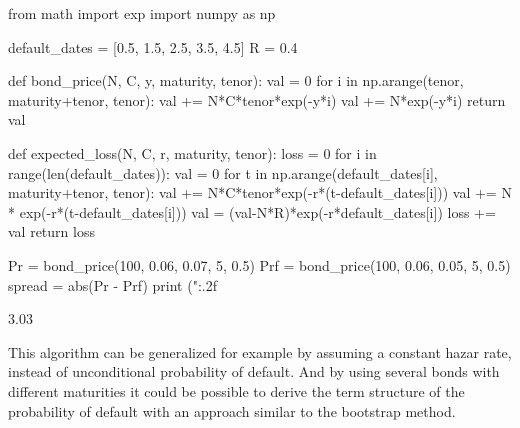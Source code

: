 \begin{ipython}
from math import exp
import numpy as np

default_dates = [0.5, 1.5, 2.5, 3.5, 4.5]
R = 0.4

def bond_price(N, C, y, maturity, tenor):
    val = 0
    for i in np.arange(tenor, maturity+tenor, tenor):
        val += N*C*tenor*exp(-y*i)
    val += N*exp(-y*i)
    return val

def expected_loss(N, C, r, maturity, tenor):
    loss = 0
    for i in range(len(default_dates)):
        val = 0
        for t in np.arange(default_dates[i], maturity+tenor, tenor):
            val += N*C*tenor*exp(-r*(t-default_dates[i]))
        val += N * exp(-r*(t-default_dates[i]))
        val = (val-N*R)*exp(-r*default_dates[i])
        loss += val
    return loss

Pr = bond_price(100, 0.06, 0.07, 5, 0.5)
Prf = bond_price(100, 0.06, 0.05, 5, 0.5)
spread = abs(Pr - Prf)
print ("{:.2f}%
\end{ipython}
\begin{ioutput}
3.03%
\end{ioutput}

This algorithm can be generalized for example by assuming a constant hazar rate, instead of unconditional probability of default. And by using several bonds with different maturities it could be possible to derive the term structure of the probability of default with an approach similar to the bootstrap method.

